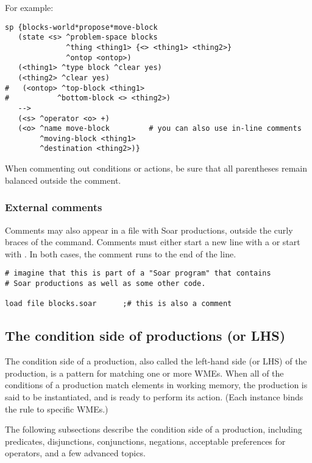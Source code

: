 For example:
\begin{verbatim}
sp {blocks-world*propose*move-block
   (state <s> ^problem-space blocks
              ^thing <thing1> {<> <thing1> <thing2>}
              ^ontop <ontop>)
   (<thing1> ^type block ^clear yes)
   (<thing2> ^clear yes)
#   (<ontop> ^top-block <thing1>
#           ^bottom-block <> <thing2>)
   -->
   (<s> ^operator <o> +)
   (<o> ^name move-block         # you can also use in-line comments
        ^moving-block <thing1>
        ^destination <thing2>)}
\end{verbatim}

When commenting out conditions or actions, be sure that all parentheses remain balanced outside the comment.

\subsubsection*{External comments}

Comments may also appear in a file with Soar productions, outside  the curly braces of the  command.  Comments must either start a new line with a \soar{\#} or start with \soar{;\#}. In both cases, the comment runs to the end of the line.

\begin{verbatim}
# imagine that this is part of a "Soar program" that contains 
# Soar productions as well as some other code.

load file blocks.soar      ;# this is also a comment
\end{verbatim}


\subsection{The condition side of productions (or LHS)}
\label{SYNTAX-pm-lhs}

The condition side of a production, also called the left-hand side (or LHS) of the production, is a pattern for matching one or more WMEs. When all of the conditions of a production match elements in working memory, the production is said to be instantiated, and is ready to perform its action. (Each instance binds the rule to specific WMEs.)

The following subsections describe the condition side of a production, including predicates, disjunctions, conjunctions, negations, acceptable preferences for operators, and a few advanced topics. 


